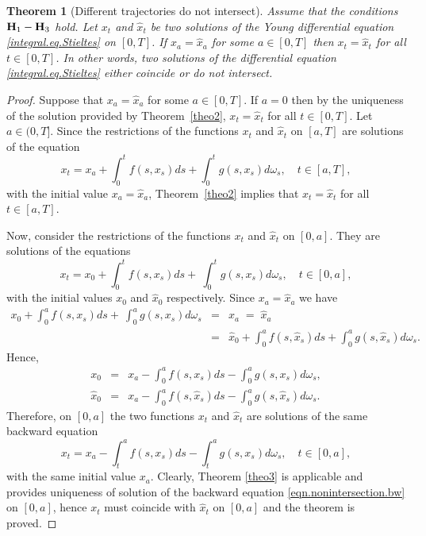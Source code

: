 \documentclass[10pt]{article}
\numberwithin{equation}{section} %
\newtheorem{theorem}{Theorem}[section]
{ \theorembodyfont{\normalfont} %
\newtheorem{example}[theorem]{Example}
\newtheorem{remark}[theorem]{Remark}
}
\begin{document}
 \begin{theorem}[Different trajectories do not intersect]\label{flow1}
Assume that the conditions ${\textbf H}_1-{\textbf H}_3$ hold.
 Let $x_t$ and $\hat{x}_t$ be two solutions of the Young differential equation \eqref{integral.eq.Stieltes} on $[0,T]$. If  $x_a = \hat{x}_a$ for some $a\in [0,T]$ then $x_t =\hat{x}_t$ for all $t\in [0,T]$. In other words, two solutions of the differential equation \eqref{integral.eq.Stieltes} either coincide or do not intersect.
 \end{theorem}
 \begin{proof}
Suppose that $x_a=\hat{x}_a$ for some $a\in [0,T]$. If $a=0$ then by the uniqueness of the solution provided by Theorem~\ref{theo2}, $x_t =\hat{x}_t$ for all $t\in [0,T]$. Let $a\in (0,T]$.
Since the restrictions of the functions $x_t$ and $\hat{x}_t$ on $[a,T]$ are solutions of the equation
$$
 x_t = x_a + \int_0^t f(s,x_s) ds +  \int_0^t g(s,x_s) d\omega_s, \quad t\in [a,T],
$$
with the initial value $x_a=\hat{x}_a$,  Theorem~\ref{theo2} implies that  $x_t=\hat{x}_t$ for all $t\in [a,T]$.

Now, consider the restrictions of the functions $x_t$ and $\hat{x}_t$ on $[0,a]$. They are solutions of the equations
 $$
 x_t = x_0 + \int_0^t f(s,x_s) ds + \ \int_0^t g(s,x_s) d\omega_s, \quad t\in [0,a],
$$
with the initial values $x_0$ and ${\hat x}_0$ respectively. Since  $x_a=\hat{x}_a$ we have
\begin{eqnarray*}
x_0 + \int_0^a f(s,x_s) ds + \ \int_0^a g(s,x_s) d\omega_s &=& x_a \; =\;  {\hat x}_a\\
&=& {\hat x}_0 + \int_0^a f(s,{\hat x}_s) ds +  \int_0^a g(s,{\hat x}_s) d\omega_s.
\end{eqnarray*}
Hence,
\begin{eqnarray*}
x_0 &=& x_a - \int_0^a f(s,x_s) ds -  \int_0^a g(s,x_s) d\omega_s,\\
{\hat x}_0 &=& x_a- \int_0^a f(s,{\hat x}_s) ds -  \int_0^a g(s,{\hat x}_s) d\omega_s.
\end{eqnarray*}
 Therefore, on $[0,a]$ the two functions $x_t$ and $\hat{x}_t$ are solutions of the same backward equation
 \begin{equation}\label{eqn.nonintersection.bw}
  x_t = x_a - \int_t^a f(s,x_s) ds -  \int_t^a g(s,x_s) d\omega_s, \quad t\in [0,a],
\end{equation}
 with the same initial value $x_a$. Clearly, Theorem \ref{theo3} is applicable and  provides uniqueness of solution of the backward equation \eqref{eqn.nonintersection.bw} on $[0,a]$, hence  $x_t$ must coincide with $\hat{x}_t$  on $[0,a]$ and the theorem is proved.
 \end{proof}
 
\end{document}
